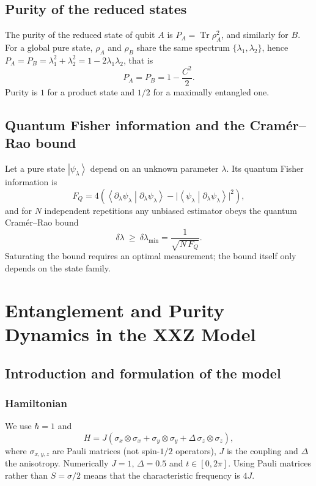 \documentclass[11pt,a4paper]{article}
\newcommand{\ket}[1]{\left|#1\right\rangle}
\newcommand{\braket}[2]{\left\langle #1\middle|#2\right\rangle}
\newcommand{\Tr}{\operatorname{Tr}}
\newcommand{\FQ}{F_Q}
\begin{document}
\subsection{Purity of the reduced states}

The purity of the reduced state of qubit $A$ is $P_A=\Tr\rho_A^2$, and similarly for $B$. For a global pure state, $\rho_A$ and $\rho_B$ share the same spectrum $\{\lambda_1,\lambda_2\}$, hence $P_A=P_B=\lambda_1^2+\lambda_2^2=1-2\lambda_1\lambda_2$, that is
\begin{equation}
  P_A=P_B=1-\frac{C^2}{2}.
  \label{eq:purity-C}
\end{equation}
Purity is $1$ for a product state and $1/2$ for a maximally entangled one.

\subsection{Quantum Fisher information and the Cram\'er--Rao bound}

Let a pure state $\ket{\psi_\lambda}$ depend on an unknown parameter $\lambda$. Its quantum Fisher information is
\begin{equation}
  \FQ=4\left(\braket{\partial_\lambda\psi_\lambda}{\partial_\lambda\psi_\lambda}-\bigl\lvert\braket{\psi_\lambda}{\partial_\lambda\psi_\lambda}\bigr\rvert^2\right),
\end{equation}
and for $N$ independent repetitions any unbiased estimator obeys the quantum Cram\'er--Rao bound \cite{BraunsteinCaves1994,Giovannetti2011}
\begin{equation}
  \delta\lambda\ \ge\ \delta\lambda_{\min}=\frac{1}{\sqrt{N\,\FQ}}.
\end{equation}
Saturating the bound requires an optimal measurement; the bound itself only depends on the state family.

\section{Entanglement and Purity Dynamics in the XXZ Model}\label{sec:dynamics}

\subsection{Introduction and formulation of the model}

\subsubsection{Hamiltonian}
We use $\hbar=1$ and
\begin{equation}
  H=J\left(\sigma_x\otimes\sigma_x+\sigma_y\otimes\sigma_y+\Delta\,\sigma_z\otimes\sigma_z\right),
\end{equation}
where $\sigma_{x,y,z}$ are Pauli matrices (not spin-$1/2$ operators), $J$ is the coupling and $\Delta$ the anisotropy. Numerically $J=1$, $\Delta=0.5$ and $t\in[0,2\pi]$. Using Pauli matrices rather than $S=\sigma/2$ means that the characteristic frequency is $4J$.
\end{document}
